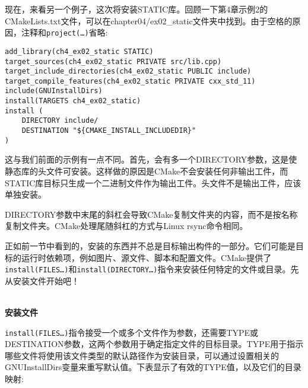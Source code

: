 现在，来看另一个例子，这次将安装STATIC库。回顾一下第4章示例2的CMakeLists.txt文件，可以在chapter04/ex02\_static文件夹中找到。由于空格的原因，注释和\texttt{project(…)}省略:

\begin{lstlisting}[style=styleCMake]
add_library(ch4_ex02_static STATIC)
target_sources(ch4_ex02_static PRIVATE src/lib.cpp)
target_include_directories(ch4_ex02_static PUBLIC include)
target_compile_features(ch4_ex02_static PRIVATE cxx_std_11)
include(GNUInstallDirs)
install(TARGETS ch4_ex02_static)
install (
	DIRECTORY include/
	DESTINATION "${CMAKE_INSTALL_INCLUDEDIR}"
)
\end{lstlisting}

这与我们前面的示例有一点不同。首先，会有多一个DIRECTORY参数，这是使静态库的头文件可安装。这样做的原因是CMake不会安装任何非输出工件，而STATIC库目标只生成一个二进制文件作为输出工件。头文件不是输出工件，应该单独安装。

\begin{tcolorbox}[colback=webgreen!5!white,colframe=webgreen!75!black,title=Note]
DIRECTORY参数中末尾的斜杠会导致CMake复制文件夹的内容，而不是按名称复制文件夹。CMake处理尾随斜杠的方式与Linux rsync命令相同。
\end{tcolorbox}


正如前一节中看到的，安装的东西并不总是目标输出构件的一部分。它们可能是目标的运行时依赖项，例如图片、源文件、脚本和配置文件。CMake提供了\texttt{install(FILES…)}和\texttt{install(DIRECTORY…)}指令来安装任何特定的文件或目录。先从安装文件开始吧！

\hspace*{\fill} \\ %
\noindent
\textbf{安装文件}
 
\texttt{install(FILES…)}指令接受一个或多个文件作为参数，还需要TYPE或DESTINATION参数，这两个参数用于确定指定文件的目标目录。TYPE用于指示哪些文件将使用该文件类型的默认路径作为安装目录，可以通过设置相关的GNUInstallDirs变量来重写默认值。下表显示了有效的TYPE值，以及它们的目录映射:

